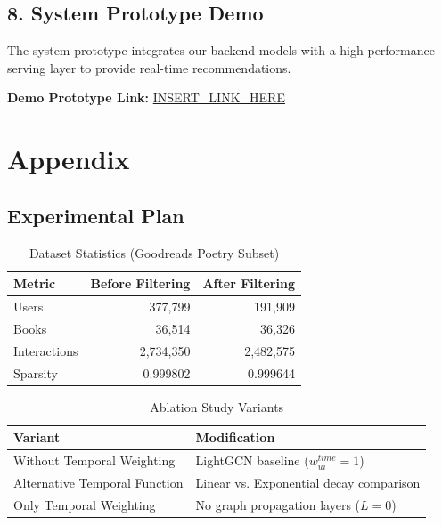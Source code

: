 \documentclass[conference]{IEEEtran}
\begin{document}
\subsection*{8. System Prototype Demo}
The system prototype integrates our backend models with a high-performance serving layer to provide real-time recommendations.

\noindent \textbf{Demo Prototype Link:} \url{INSERT_LINK_HERE}

\vspace{2em}

\section*{Appendix}
\subsection*{Experimental Plan}

\begin{table}[!t]
    \centering
    \caption{Dataset Statistics (Goodreads Poetry Subset)}
    \begin{tabular}{lrr}
        \toprule
        \textbf{Metric} & \textbf{Before Filtering} & \textbf{After Filtering} \\
        \midrule
        Users & 377,799 & 191,909 \\
        Books & 36,514 & 36,326 \\
        Interactions & 2,734,350 & 2,482,575 \\
        Sparsity & 0.999802 & 0.999644 \\
        \bottomrule
    \end{tabular}
\end{table}

\begin{table}[!t]
    \centering
    \caption{Ablation Study Variants}
    \begin{tabular}{ll}
        \toprule
        \textbf{Variant} & \textbf{Modification} \\
        \midrule
        Without Temporal Weighting & LightGCN baseline ($w_{ui}^{time} = 1$) \\
        Alternative Temporal Function & Linear vs. Exponential decay comparison \\
        Only Temporal Weighting & No graph propagation layers ($L=0$) \\
        \bottomrule
    \end{tabular}
\end{table}
\end{document}
